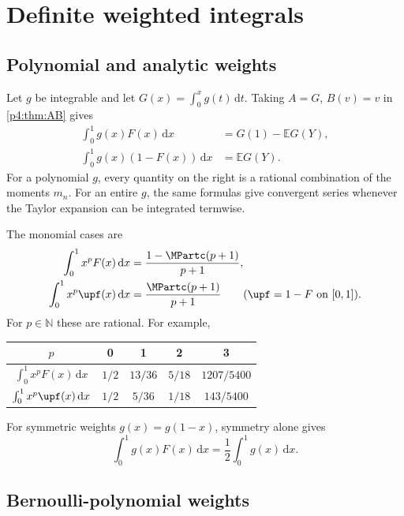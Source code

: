 \documentclass[11pt,oneside]{article}
\theoremstyle{definition}
\theoremstyle{remark}
\newcommand{\F}{F}
\newcommand{\E}{\mathbb E}
\newcommand{\N}{\mathbb N}
\newcommand{\dd}{\,\mathrm d}
\newcommand{\1}{\mathbf 1}
\begin{document}
\section{Definite weighted integrals}

\subsection{Polynomial and analytic weights}

Let \(g\) be integrable and let \(G(x)=\int_0^xg(t)\dd t\).  Taking \(A=G\),
\(B(v)=v\) in \cref{p4:thm:AB} gives
\begin{align}
 \int_0^1g(x)\F(x)\dd x&=G(1)-\E G(Y),
 \label{p4:eq:analytic-kernel-F}\\
 \int_0^1g(x)(1-\F(x))\dd x&=\E G(Y).
 \label{p4:eq:analytic-kernel-up}
\end{align}
For a polynomial \(g\), every quantity on the right is a rational combination of the
moments \(m_n\).  For an entire \(g\), the same formulas give convergent series whenever
the Taylor expansion can be integrated termwise.

The monomial cases are
\begin{align}
 \int_0^1x^p\F(x)\dd x&=\frac{1-\MPartc(p+1)}{p+1},
 \label{p4:eq:monomial-F-definite}\\
 \int_0^1x^p\upf(x)\dd x&=\frac{\MPartc(p+1)}{p+1}
 \qquad(\upf=1-\F\text{ on }[0,1]).
 \label{p4:eq:monomial-up-definite}
\end{align}
For \(p\in\N\) these are rational.  For example,
\begin{center}
\begin{tabular}{@{}c|cccc@{}}
\toprule
\(p\)&0&1&2&3\\
\midrule
\(\int_0^1x^p\F(x)\dd x\)&\(1/2\)&\(13/36\)&\(5/18\)&\(1207/5400\)\\
\(\int_0^1x^p\upf(x)\dd x\)&\(1/2\)&\(5/36\)&\(1/18\)&\(143/5400\)\\
\bottomrule
\end{tabular}
\end{center}

For symmetric weights \(g(x)=g(1-x)\), symmetry alone gives
\begin{equation}\label{p4:eq:symmetric-weight}
 \int_0^1g(x)\F(x)\dd x=\frac12\int_0^1g(x)\dd x.
\end{equation}

\subsection{Bernoulli-polynomial weights}
\end{document}
